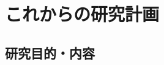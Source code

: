 \documentclass[11pt,a4paper,uplatex,twoside,dvipdfmx]{ujarticle} 	%
\newcommand{\研究課題名}{\mgfamily ストカスティック形式、原始ブラックホール、重力波観測から迫るインフレーション}
\newcommand{\研究機関名}{\mgfamily 名古屋大学}
\newcommand{\申請者氏名}{\mgfamily 多田 祐一郎}
\newcommand{\研究代表者氏名}{\申請者氏名}
\newcommand{\研究期間の最終元号年度}{34}	%
\begin{document}
{	%
	

}

\section{これからの研究計画}
\subsection{研究目的・内容}
\end{document}
